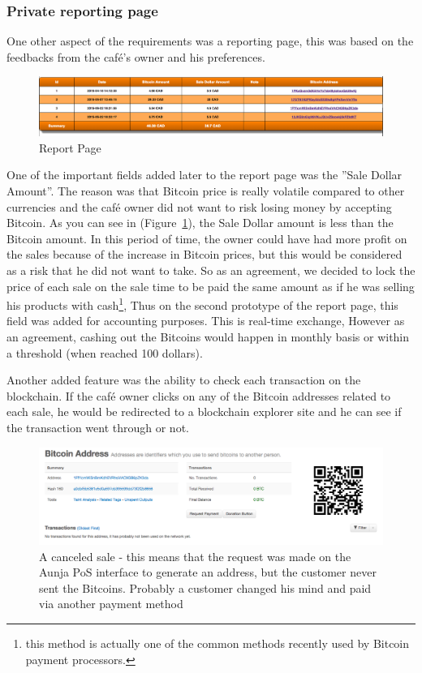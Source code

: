 \subsubsection{Private reporting page}
One other aspect of the requirements was a reporting page, this was based on the feedbacks from the caf\'{e}'s owner and his preferences.

\begin{figure}[htb!p]
\centering
\includegraphics[width=\linewidth]{fig/report_page.png}
  \caption{Report Page}
\label{fig:report_page}
\end{figure}

One of the important fields added later to the report page was the ''Sale Dollar Amount''. The reason was that Bitcoin price is really volatile compared to other currencies and the caf\'{e} owner did not want to risk losing money by accepting Bitcoin. As you can see in (Figure~\ref{fig:report_page}), the Sale Dollar amount is less than the Bitcoin amount. In this period of time, the owner could have had more profit on the sales because of the increase in Bitcoin prices, but this would be considered as a risk that he did not want to take. So as an agreement, we decided to lock the price of each sale on the sale time to be paid the same amount as if he was selling his products with cash\footnote{this method is actually one of the common methods recently used by Bitcoin payment processors.}, Thus on the second prototype of the report page, this field was added for accounting purposes. This is real-time exchange, However as an agreement, cashing out the Bitcoins would happen in monthly basis or within a threshold (\eg when reached 100 dollars).

Another added feature was the ability to check each transaction on the blockchain. If the caf\'{e} owner clicks on any of the Bitcoin addresses related to each sale, he would be redirected to a blockchain explorer site and he can see if the transaction went through or not.

\begin{figure}[htb!p]
\centering
\includegraphics[width=\linewidth]{fig/canceled_sale.png}
  \caption{A canceled sale - this means that the request was made on the Aunja PoS interface to generate an address, but the customer never sent the Bitcoins. Probably a customer changed his mind and paid via another payment method}
\label{fig:canceled_sale}
\end{figure}


